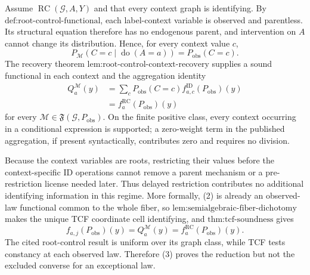 Assume \(\operatorname{RC}(\mathcal G,A,Y)\) and that every context graph is identifying.  By \(\text{def:root-control-functional}\), each label-context variable is observed and parentless.  Its structural equation therefore has no endogenous parent, and intervention on \(A\) cannot change its distribution.  Hence, for every context value \(c\),
\[
P_{\mathcal M}(C=c\mid\operatorname{do}(A=a))
=P_{\mathrm{obs}}(C=c).
\tag{1}
\]
The recovery theorem \(\text{lem:root-control-context-recovery}\) supplies a sound functional in each context and the aggregation identity
\[
\begin{aligned}
Q_a^{\mathcal M}(y)
&=\sum_cP_{\mathrm{obs}}(C=c)
f^{\mathrm{ID}}_{a,c}(P_{\mathrm{obs}})(y)\\
&=f_a^{\mathrm{RC}}(P_{\mathrm{obs}})(y)
\end{aligned}
\tag{2}
\]
for every \(\mathcal M\in\mathfrak F(\mathcal G,P_{\mathrm{obs}})\).  On the finite positive class, every context occurring in a conditional expression is supported; a zero-weight term in the published aggregation, if present syntactically, contributes zero and requires no division.

Because the context variables are roots, restricting their values before the context-specific ID operations cannot remove a parent mechanism or a pre-restriction license needed later.  Thus delayed restriction contributes no additional identifying information in this regime.  More formally, (2) is already an observed-law functional common to the whole fiber, so \(\text{lem:semialgebraic-fiber-dichotomy}\) makes the unique TCF coordinate cell identifying, and \(\text{thm:tcf-soundness}\) gives
\[
f_{a,j}(P_{\mathrm{obs}})(y)
=Q_a^{\mathcal M}(y)
=f_a^{\mathrm{RC}}(P_{\mathrm{obs}})(y).
\tag{3}
\]
The cited root-control result is uniform over its graph class, while TCF tests constancy at each observed law.  Therefore (3) proves the reduction but not the excluded converse for an exceptional law.